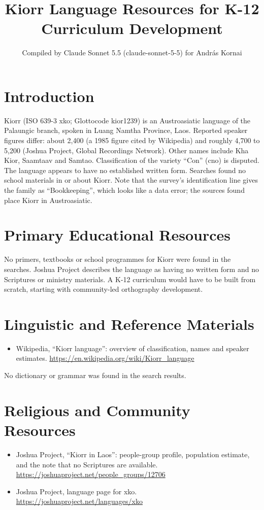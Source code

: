 \documentclass[12pt]{article}
\title{Kiorr Language Resources for K-12 Curriculum Development}
\author{Compiled by Claude Sonnet 5.5 (claude-sonnet-5-5) for Andr\'as Kornai}
\date{}
\begin{document}
\maketitle

\section{Introduction}
Kiorr (ISO 639-3 xko; Glottocode kior1239) is an Austroasiatic language of the Palaungic branch, spoken in Luang Namtha Province, Laos. Reported speaker figures differ: about 2,400 (a 1985 figure cited by Wikipedia) and roughly 4,700 to 5,200 (Joshua Project, Global Recordings Network). Other names include Kha Kior, Saamtaav and Samtao. Classification of the variety ``Con'' (cno) is disputed. The language appears to have no established written form. Searches found no school materials in or about Kiorr. Note that the survey's identification line gives the family as ``Bookkeeping'', which looks like a data error; the sources found place Kiorr in Austroasiatic.

\section{Primary Educational Resources}
No primers, textbooks or school programmes for Kiorr were found in the searches. Joshua Project describes the language as having no written form and no Scriptures or ministry materials. A K-12 curriculum would have to be built from scratch, starting with community-led orthography development.

\section{Linguistic and Reference Materials}
\begin{itemize}
\item Wikipedia, ``Kiorr language'': overview of classification, names and speaker estimates. \url{https://en.wikipedia.org/wiki/Kiorr_language}
\end{itemize}
No dictionary or grammar was found in the search results.

\section{Religious and Community Resources}
\begin{itemize}
\item Joshua Project, ``Kiorr in Laos'': people-group profile, population estimate, and the note that no Scriptures are available. \url{https://joshuaproject.net/people_groups/12706}
\item Joshua Project, language page for xko. \url{https://joshuaproject.net/languages/xko}
\end{itemize}
\end{document}
